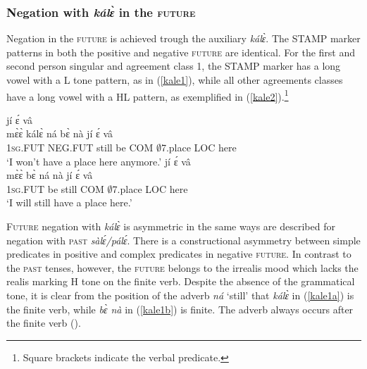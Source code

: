 \subsubsection{Negation with {\itshape kálɛ̀} in the \textsc{future}}
\label{sec:NEGFUT}

Negation in the \textsc{future} is achieved trough the auxiliary {\itshape kálɛ̀}. The STAMP marker patterns in both the positive and negative \textsc{future} are identical. For the first and second person singular and agreement class 1, the STAMP marker has a long vowel with a L tone pattern, as in (\ref{kale1}), while all other agreements classes have a long vowel with a HL pattern, as exemplified in (\ref{kale2}).\footnote{Square brackets indicate the verbal predicate.}

\begin{exe} 
\ex\label{kale1}
\begin{xlist}
\ex\label{kale1a}
   jí ɛ́ vâ \\
        mɛ̀ɛ̀ kálɛ̀ ná bɛ̀ nà jí ɛ́ vâ \\
           1\textsc{sg}.FUT NEG.FUT still be COM $\emptyset$7.place LOC here  \\
    \trans `I won't have a place here anymore.'
\ex\label{kale1b}
  \glll  [{\bfseries mɛ̀ɛ̀} bɛ̀ ná nà] jí ɛ́ vâ \\
        mɛ̀ɛ̀ bɛ̀ ná nà jí ɛ́ vâ \\
           1\textsc{sg}.FUT be still COM $\emptyset$7.place LOC here  \\
    \trans `I will still have a place here.'
\end{xlist}
\end{exe}

\textsc{Future} negation with {\itshape kálɛ̀} is asymmetric in the same ways are described for negation with \textsc{past} {\itshape sàlɛ́/pálɛ́}. There is a constructional asymmetry between simple predicates in positive and complex predicates in negative \textsc{future}. In contrast to the \textsc{past} tenses, however, the \textsc{future} belongs to the irrealis mood which lacks the realis marking H tone on the finite verb. Despite the absence of the grammatical tone, it is clear from the position of the adverb {\itshape ná} `still' that {\itshape kálɛ̀} in (\ref{kale1a}) is the finite verb, while {\itshape bɛ̀ nà} in (\ref{kale1b}) is finite. The adverb always occurs after the finite verb ().

